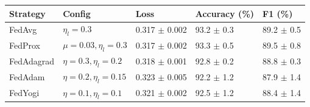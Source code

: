 \begin{tabular}{lllll}
\toprule
Strategy & Config & Loss & Accuracy (\%) & F1 (\%) \\
\midrule
FedAvg & $\eta_l=0.3$ & 0.317 $\pm$ 0.002 & 93.2 $\pm$ 0.3 & 89.2 $\pm$ 0.5 \\
FedProx & $\mu=0.03, \eta_l=0.3$ & 0.317 $\pm$ 0.002 & 93.3 $\pm$ 0.5 & 89.5 $\pm$ 0.8 \\
FedAdagrad & $\eta=0.3, \eta_l=0.2$ & 0.318 $\pm$ 0.001 & 92.8 $\pm$ 0.2 & 88.8 $\pm$ 0.3 \\
FedAdam & $\eta=0.2, \eta_l=0.15$ & 0.323 $\pm$ 0.005 & 92.2 $\pm$ 1.2 & 87.9 $\pm$ 1.4 \\
FedYogi & $\eta=0.1, \eta_l=0.1$ & 0.321 $\pm$ 0.002 & 92.5 $\pm$ 1.2 & 88.4 $\pm$ 1.4 \\
\bottomrule
\end{tabular}
